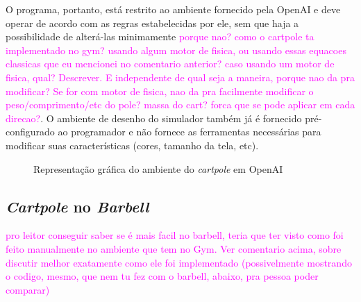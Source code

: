 \documentclass[cic,tc]{iiufrgs}
\newcommand\bruno[1]{\textcolor{magenta}{#1}}
\begin{document}
    
    \par O programa, portanto, está restrito ao ambiente fornecido pela OpenAI e deve operar de acordo com as regras estabelecidas
    por ele, sem que haja a possibilidade de alterá-las minimamente \bruno{porque nao? como o cartpole ta implementado no gym? usando algum motor de fisica, ou usando essas equacoes classicas que eu mencionei no comentario anterior? caso usando um motor de fisica, qual? Descrever. E independente de qual seja a maneira, porque nao da pra modificar? Se for com motor de fisica, nao da pra facilmente modificar o peso/comprimento/etc do pole? massa do cart? forca que se pode aplicar em cada direcao?}. O ambiente de desenho do simulador também já é fornecido
    pré-configurado ao programador e não fornece as ferramentas necessárias para modificar suas características (cores, tamanho
    da tela, etc).
    
    \begin{figure}[h!]
      \begin{center}
      \caption{Representação gráfica do ambiente do \textit{cartpole} em OpenAI}
      \label{fig:cartpole_openai}
    \end{center}
    \end{figure}
    
    \subsection{\textit{Cartpole} no \textit{Barbell}}
    \bruno{pro leitor conseguir saber se é mais facil no barbell, teria que ter visto como foi feito manualmente no ambiente que tem no Gym. Ver comentario acima, sobre discutir melhor exatamente como ele foi implementado (possivelmente mostrando o codigo, mesmo, que nem tu fez com o barbell, abaixo, pra pessoa poder comparar)}
    
\end{document}
